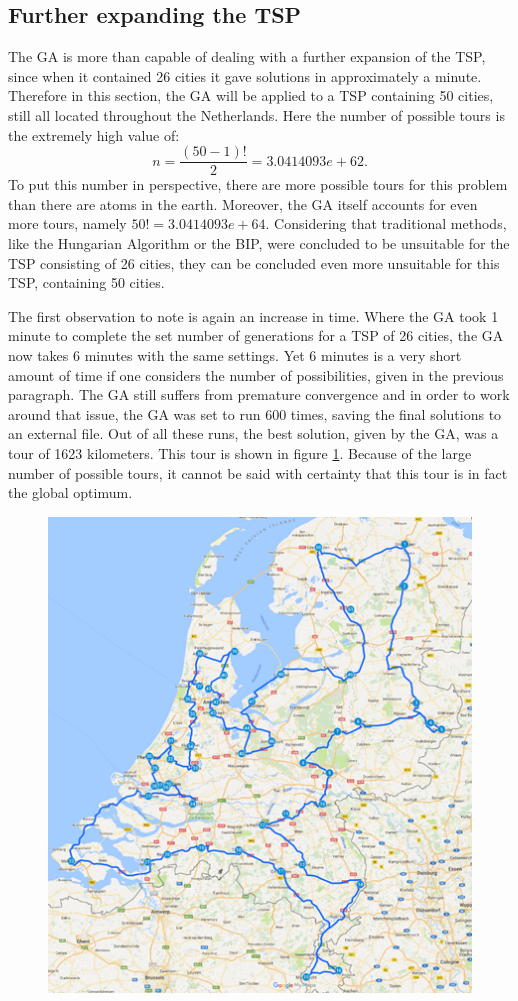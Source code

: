 \subsection{Further expanding the TSP}
\par
The GA is more than capable of dealing with a further expansion of the TSP, since when it contained 26 cities it gave solutions in approximately a minute. Therefore in this section, the GA will be applied to a TSP containing 50 cities, still all located throughout the Netherlands. Here the number of possible tours is the extremely high value of:
\[n = \frac{(50-1)!}{2} = 3.0414093e+62.\]
To put this number in perspective, there are more possible tours for this problem than there are atoms in the earth. Moreover, the GA itself accounts for even more tours, namely $50! = 3.0414093e+64$. Considering that traditional methods, like the Hungarian Algorithm or the BIP, were concluded to be unsuitable for the TSP consisting of 26 cities, they can be concluded even more unsuitable for this TSP, containing 50 cities.
\par
The first observation to note is again an increase in time. Where the GA took 1 minute to complete the set number of generations for a TSP of 26 cities, the GA now takes 6 minutes with the same settings. Yet 6 minutes is a very short amount of time if one considers the number of possibilities, given in the previous paragraph. The GA still suffers from premature convergence and in order to work around that issue, the GA was set to run 600 times, saving the final solutions to an external file. Out of all these runs, the best solution, given by the GA, was a tour of 1623 kilometers. This tour is shown in figure \ref{1623tour}. Because of the large number of possible tours, it cannot be said with certainty that this tour is in fact the global optimum. 
\begin{figure}[H]
\centering
\includegraphics{1623tour}
\label{1623tour}
\end{figure}

